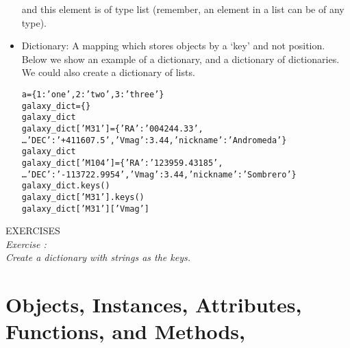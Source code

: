 \begin{itemize}
  and this element is of type list (remember, an element in a list can
  be of any type).
\item Dictionary: A mapping which stores objects by a `key' and not
  position.  Below we show an example of a dictionary, and a
  dictionary of dictionaries.  We could also create a dictionary of
  lists.
\begin{alltt}
\pytab a = \{1:'one', 2:'two', 3:'three'\}
\pytab galaxy_dict = \{\} 
\pytab galaxy_dict 
\pytab galaxy_dict['M31'] = \{'RA':'00 42 44.33',
\ldots     'DEC':'+41 16 07.5','Vmag':3.44,'nickname':'Andromeda'\} 
\pytab galaxy_dict 
\pytab galaxy_dict['M104'] = \{'RA':'12 39 59.43185', 
\ldots    'DEC':'-11 37 22.9954','Vmag':3.44,'nickname':'Sombrero'\} 
\pytab galaxy_dict.keys()  
\pytab galaxy_dict['M31'].keys() 
\pytab galaxy_dict['M31']['Vmag']
\end{alltt}
\end{itemize}

{\color{blue} {\sf\small EXERCISES}} \\
{\it Exercise  :  \\
Create a dictionary with strings as the keys.
}

\section{Objects, Instances, Attributes, Functions, and Methods, }
\label{s:attribute}

